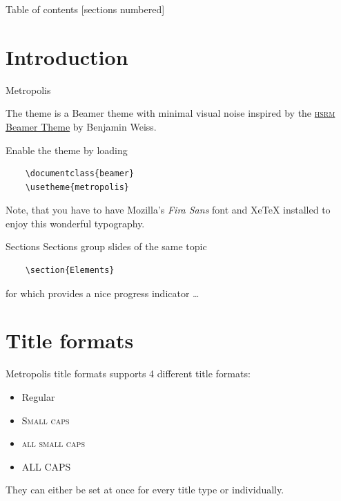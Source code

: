 
\begin{frame}{Table of contents}
  [sections numbered]
  \tableofcontents[hideallsubsections]
\end{frame}

\section{Introduction}

\begin{frame}[fragile]{Metropolis}

  The \themename theme is a Beamer theme with minimal visual noise
  inspired by the \href{https://github.com/hsrmbeamertheme/hsrmbeamertheme}{\textsc{hsrm} Beamer
  Theme} by Benjamin Weiss.

  Enable the theme by loading

  \begin{verbatim}    \documentclass{beamer}
    \usetheme{metropolis}\end{verbatim}

  Note, that you have to have Mozilla's \emph{Fira Sans} font and XeTeX
  installed to enjoy this wonderful typography.
\end{frame}
\begin{frame}[fragile]{Sections}
  Sections group slides of the same topic

  \begin{verbatim}    \section{Elements}\end{verbatim}

  for which \themename provides a nice progress indicator \ldots
\end{frame}

\section{Title formats}

\begin{frame}{Metropolis title formats}
	\themename supports 4 different title formats:
	\begin{itemize}
		\item Regular
		\item \textsc{Small caps}
		\item \textsc{all small caps}
		\item ALL CAPS
	\end{itemize}
	They can either be set at once for every title type or individually.
\end{frame}

